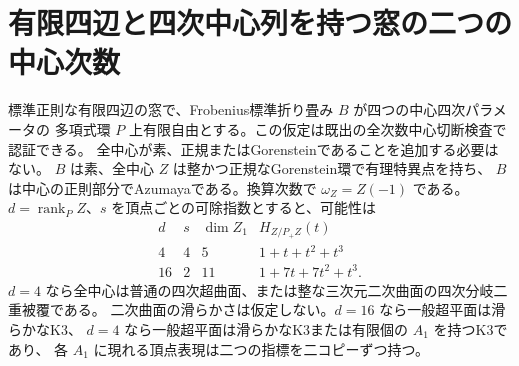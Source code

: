 \section{有限四辺と四次中心列を持つ窓の二つの中心次数}
\label{sec:central-cut-center-dichotomy}
\begin{theorem}\label{thm:central-cut-center-dichotomy}
標準正則な有限四辺の窓で、Frobenius標準折り畳み $B$ が四つの中心四次パラメータの
多項式環 $P$ 上有限自由とする。この仮定は既出の全次数中心切断検査で認証できる。
全中心が素、正規またはGorensteinであることを追加する必要はない。
$B$ は素、全中心 $Z$ は整かつ正規なGorenstein環で有理特異点を持ち、
$B$ は中心の正則部分でAzumayaである。換算次数で $\omega_Z=Z(-1)$ である。
$d=\operatorname{rank}_P Z$、$s$ を頂点ごとの可除指数とすると、可能性は
\[
\begin{array}{c|c|c|c}
 d&s&\dim Z_1& H_{Z/P_+Z}(t)\\\hline
 4&4&5&1+t+t^2+t^3\\
 16&2&11&1+7t+7t^2+t^3 .
\end{array}
\]
$d=4$ なら全中心は普通の四次超曲面、または整な三次元二次曲面の四次分岐二重被覆である。
二次曲面の滑らかさは仮定しない。$d=16$ なら一般超平面は滑らかなK3、
$d=4$ なら一般超平面は滑らかなK3または有限個の $A_1$ を持つK3であり、
各 $A_1$ に現れる頂点表現は二つの指標を二コピーずつ持つ。
\end{theorem}
